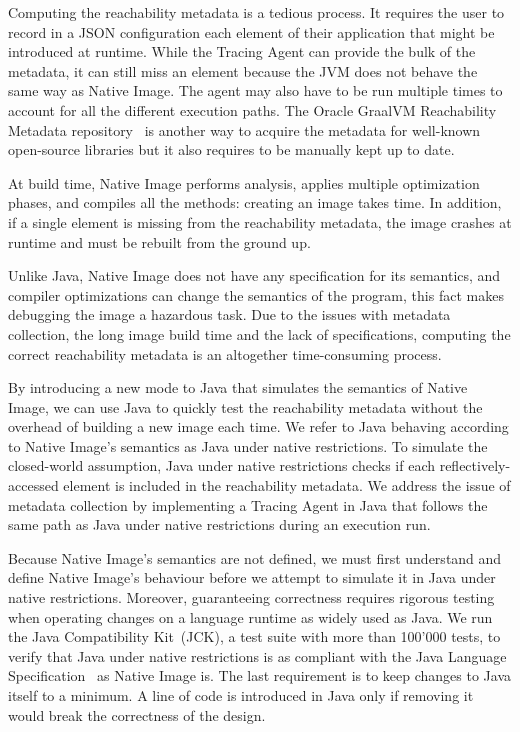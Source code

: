 Computing the reachability metadata is a tedious process. It requires the user to record in a JSON configuration each element of their application that might be introduced at runtime. While the Tracing Agent can provide the bulk of the metadata, it can still miss an element because the JVM does not behave the same way as Native Image. The agent may also have to be run multiple times to account for all the different execution paths. The Oracle GraalVM Reachability Metadata repository~\cite{noauthor_oraclegraalvm-reachability-metadata_2024} is another way to acquire the metadata for well-known open-source libraries but it also requires to be manually kept up to date.

At build time, Native Image performs analysis, applies multiple optimization phases, and compiles all the methods: creating an image takes time. In addition, if a single element is missing from the reachability metadata, the image crashes at runtime and must be rebuilt from the ground up. 

Unlike Java, Native Image does not have any specification for its semantics, and compiler optimizations can change the semantics of the program, this fact makes debugging the image a hazardous task.
Due to the issues with metadata collection, the long image build time and the lack of specifications, computing the correct reachability metadata is an altogether time-consuming process. 

By introducing a new mode to Java that simulates the semantics of Native Image, we can use Java to quickly test the reachability metadata without the overhead of building a new image each time. We refer to Java behaving according to Native Image's semantics as Java under native restrictions. To simulate the closed-world assumption, Java under native restrictions checks if each reflectively-accessed element is included in the reachability metadata. We address the issue of metadata collection by implementing a Tracing Agent in Java that follows the same path as Java under native restrictions during an execution run.

Because Native Image's semantics are not defined, we must first understand and define Native Image's behaviour before we attempt to simulate it in Java under native restrictions. Moreover, guaranteeing correctness requires rigorous testing when operating changes on a language runtime as widely used as Java. We run the Java Compatibility Kit~(JCK), a test suite with more than 100'000 tests, to verify that Java under native restrictions is as compliant with the Java Language Specification~\cite{noauthor_java_nodate-2} as Native Image is.
The last requirement is to keep changes to Java itself to a minimum. A line of code is introduced in Java only if removing it would break the correctness of the design.

